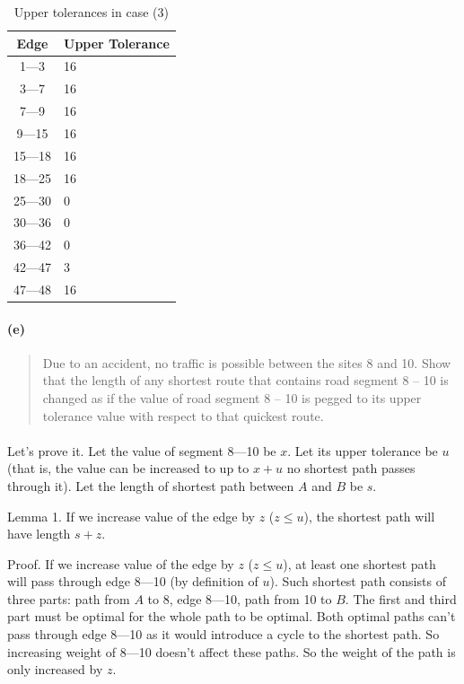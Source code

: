 \begin{table}[H]
\centering
\begin{tabular}{|c|l|}
\hline
Edge & Upper Tolerance \\ \hline
1---3 & 16 \\ \hline
3---7 & 16 \\ \hline
7---9 & 16 \\ \hline
9---15 & 16 \\ \hline
15---18 & 16 \\ \hline
18---25 & 16 \\ \hline
25---30 & 0 \\ \hline
30---36 & 0 \\ \hline
36---42 & 0 \\ \hline
42---47 & 3 \\ \hline
47---48 & 16 \\ \hline
\end{tabular}
\caption{Upper tolerances in case (3)}
\label{tolerances-1-2d-3}
\end{table}

\paragraph{(e)}

\begin{quote}
Due to an accident, no traffic is possible between the sites 8 and 10. Show that the length of any shortest route that contains road segment 8 – 10 is changed as if the value of road segment 8 – 10 is pegged to its upper tolerance value with respect to that quickest route.
\end{quote}

\paragraph{}
Let's prove it. Let the value of segment 8---10 be $x$. Let its upper tolerance be $u$ (that is, the value can be increased to up to $x+u$ no shortest path passes through it). Let the length of shortest path between $A$ and $B$ be $s$.

Lemma 1. If we increase value of the edge by $z$ ($z \leq u$), the shortest path will have length $s+z$.

Proof. If we increase value of the edge by $z$ ($z \leq u$), at least one shortest path will pass through edge 8---10 (by definition of $u$). Such shortest path consists of three parts: path from $A$ to 8, edge 8---10, path from 10 to $B$. The first and third part must be optimal for the whole path to be optimal. Both optimal paths can't pass through edge 8---10 as it would introduce a cycle to the shortest path. So increasing weight of 8---10 doesn't affect these paths. So the weight of the path is only increased by $z$.

